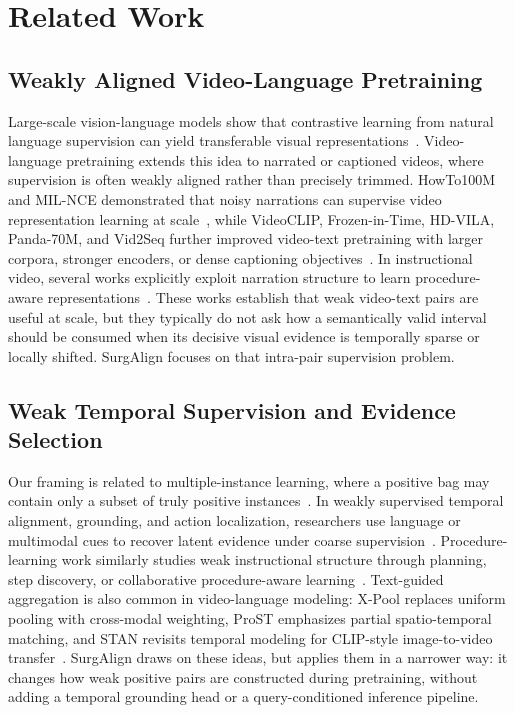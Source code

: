 \section{Related Work}
\label{sec:related_work}

\subsection{Weakly Aligned Video-Language Pretraining}

Large-scale vision-language models show that contrastive learning from natural language supervision can yield transferable visual representations~\cite{clip2021}. Video-language pretraining extends this idea to narrated or captioned videos, where supervision is often weakly aligned rather than precisely trimmed. HowTo100M and MIL-NCE demonstrated that noisy narrations can supervise video representation learning at scale~\cite{miech2019howto100m,milnce2020}, while VideoCLIP, Frozen-in-Time, HD-VILA, Panda-70M, and Vid2Seq further improved video-text pretraining with larger corpora, stronger encoders, or dense captioning objectives~\cite{videoclip2021,frozenintime2021,pan2022hdvila,wang2024panda70m,vid2seq2023}. In instructional video, several works explicitly exploit narration structure to learn procedure-aware representations~\cite{alayrac2015unsupervised,xu2023procedure_aware_repr,zhou2023procedure_aware_pretraining}. These works establish that weak video-text pairs are useful at scale, but they typically do not ask how a semantically valid interval should be consumed when its decisive visual evidence is temporally sparse or locally shifted. SurgAlign focuses on that intra-pair supervision problem.

\subsection{Weak Temporal Supervision and Evidence Selection}

Our framing is related to multiple-instance learning, where a positive bag may contain only a subset of truly positive instances~\cite{dietterich1997mil,ilse2018attentionmil}. In weakly supervised temporal alignment, grounding, and action localization, researchers use language or multimodal cues to recover latent evidence under coarse supervision~\cite{shen2021dwsa,jin2023ground_articles,huang2023wstsg,li2023boostingwtal,hu2024mmplateau,li2024fps}. Procedure-learning work similarly studies weak instructional structure through planning, step discovery, or collaborative procedure-aware learning~\cite{coin2020,p3iv2022,dvornik2023stepformer,li2024collaborative_weak_video,liu2024llm_alignment}. Text-guided aggregation is also common in video-language modeling: X-Pool replaces uniform pooling with cross-modal weighting, ProST emphasizes partial spatio-temporal matching, and STAN revisits temporal modeling for CLIP-style image-to-video transfer~\cite{gorti2022xpool,li2023prost,liu2023stan}. SurgAlign draws on these ideas, but applies them in a narrower way: it changes how weak positive pairs are constructed during pretraining, without adding a temporal grounding head or a query-conditioned inference pipeline.

